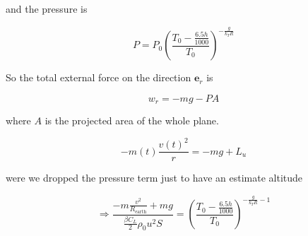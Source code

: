 \documentclass{article}
\renewcommand{\vec}[1]{\boldsymbol{#1}}
\begin{document}
and the pressure is 

\begin{equation}
    P=P_0\left(\frac{T_0-\frac{6.5h}{1000}}{T_0}\right)^{-\frac{g}{k_TR}}
\end{equation}

So the total external force on the direction $\vec{e}_r$ is 

\begin{equation}
    w_r=-mg -PA 
\end{equation}

where $A$ is the projected area of the whole plane.

\begin{equation}
    -m(t)\frac{v(t)^2}{r}=-mg+ L_u
\end{equation}

were we dropped the pressure term just to have an estimate altitude

\begin{equation}
  \Rightarrow \frac{-m\frac{v^2}{R_{\text{earth}}} +mg}{\frac{\beta C_L}{2} \rho_0 u^2S}=  \left(\frac{T_0-\frac{6.5h}{1000}}{T_0}\right)^{-\frac{g}{k_TR}-1}    
\end{equation}

\printbibliography
\end{document}

